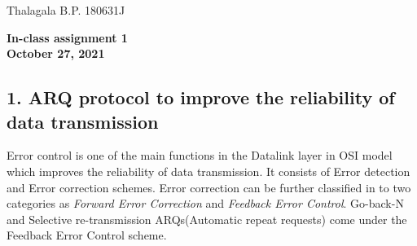 \documentclass[a4paper,11pt]{article}
\begin{document}
	Thalagala B.P. 180631J
\begin{center}	
{	\Large\textbf{In-class assignment 1}}\\[2mm]	

\textbf{October 27, 2021}
\end{center}

\subsection*{1. ARQ protocol to improve the reliability of data transmission}
Error control is one of the main functions in the Datalink layer in OSI model which improves the reliability of data transmission. It consists of Error detection and Error correction schemes. Error correction can be further classified in to two categories as \textit{Forward Error Correction} and \textit{Feedback Error Control}. Go-back-N and Selective re-transmission ARQs(Automatic repeat requests) come under the Feedback Error Control scheme. 

\begin{figure}[!h]
	\centering
	\hfill
\end{figure}
\end{document}
